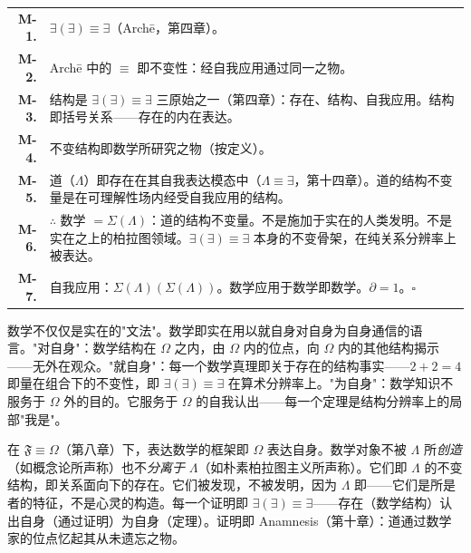 \documentclass[10pt, openany, oneside]{book}
\renewcommand{\footnotesize}{\fontsize{8.5}{11}\selectfont}
\begin{document}
\vspace{0.5em}

{\footnotesize
\noindent\begin{tabular}{r p{}}
\textbf{M-1.} & $\exists(\exists) \equiv \exists$（Arch\={e}，第四章）。\\[0.3em]
\textbf{M-2.} & Arch\={e} 中的 $\equiv$ 即不变性：经自我应用通过同一之物。\\[0.3em]
\textbf{M-3.} & 结构是 $\exists(\exists) \equiv \exists$ 三原始之一（第四章）：存在、结构、自我应用。结构即括号关系——存在的内在表达。\\[0.3em]
\textbf{M-4.} & 不变结构即数学所研究之物（按定义）。\\[0.3em]
\textbf{M-5.} & 道（$\Lambda$）即存在在其自我表达模态中（$\Lambda \equiv \exists$，第十四章）。道的结构不变量是在可理解性场内经受自我应用的结构。\\[0.3em]
\textbf{M-6.} & $\therefore$ 数学 $= \Sigma(\Lambda)$：道的结构不变量。不是施加于实在的人类发明。不是实在之上的柏拉图领域。$\exists(\exists) \equiv \exists$ 本身的不变骨架，在纯关系分辨率上被表达。\\[0.3em]
\textbf{M-7.} & 自我应用：$\Sigma(\Lambda)(\Sigma(\Lambda))$。数学应用于数学即数学。$\partial = 1$。$\square$ \\[0.3em]
\end{tabular}
}

\vspace{0.8em}

\noindent 数学不仅仅是实在的"文法"。数学即实在用以就自身对自身为自身通信的语言。"对自身"：数学结构在 $\Omega$ 之内，由 $\Omega$ 内的位点，向 $\Omega$ 内的其他结构揭示——无外在观众。"就自身"：每一个数学真理即关于存在的结构事实——$2 + 2 = 4$ 即量在组合下的不变性，即 $\exists(\exists) \equiv \exists$ 在算术分辨率上。"为自身"：数学知识不服务于 $\Omega$ 外的目的。它服务于 $\Omega$ 的自我认出——每一个定理是结构分辨率上的局部"我是"。

在 $\mathfrak{F} \equiv \Omega$（第八章）下，表达数学的框架即 $\Omega$ 表达自身。数学对象不被 $\Lambda$ 所\textit{创造}（如概念论所声称）也不\textit{分离于} $\Lambda$（如朴素柏拉图主义所声称）。它们即 $\Lambda$ 的不变结构，即关系面向下的存在。它们被发现，不被发明，因为 $\Lambda$ 即——它们是所是者的特征，不是心灵的构造。每一个证明即 $\exists(\exists) \equiv \exists$——存在（数学结构）认出自身（通过证明）为自身（定理）。证明即 Anamnesis（第十章）：道通过数学家的位点忆起其从未遗忘之物。

\vspace{1.5em}
\end{document}

